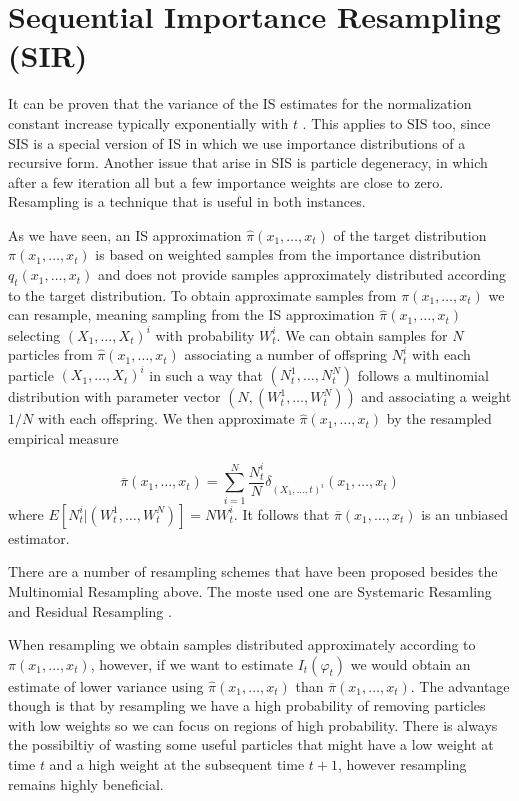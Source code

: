 \documentclass[11pt,a4paper]{article}
\begin{document}
\section{Sequential Importance Resampling (SIR)} \label{sec{SIR}}

It can be proven that the variance of the IS estimates for the normalization constant increase typically exponentially with $t$ \cite{Kong}. This applies to SIS too, since SIS is a special version of IS in which we use importance distributions of a recursive form.
Another issue that arise in SIS is particle degeneracy, in which after a few iteration all but a few importance weights are close to zero.
Resampling is a technique that is useful in both instances.

As we have seen, an IS approximation $\hat{\pi}(x_1, \dots, x_t)$ of the target distribution $\pi(x_1, \dots, x_t)$ is based on weighted samples from the importance distribution $q_t(x_1, \dots, x_t)$ and does not provide samples approximately distributed according to the target distribution. To obtain approximate samples from $\pi(x_1, \dots, x_t)$ we can resample, meaning sampling from the IS approximation $\hat{\pi}(x_1, \dots, x_t)$ selecting $(X_1, \dots, X_t)^i$ with probability $W_t^i$. We can obtain samples for $N$ particles from $\hat{\pi}(x_1, \dots, x_t)$ associating a number of offspring $N^i_t$ with each particle $(X_1, \dots, X_t)^i$ in such a way that $(N_t^1, \dots, N^N_t)$ follows a multinomial distribution with parameter vector $(N, (W_t^1, \dots, W_t^N))$ and associating a weight $1/N$ with each offspring. We then approximate $\hat{\pi}(x_1, \dots, x_t)$ by the resampled empirical measure

\begin{equation*}
    \overline{\pi}(x_1, \dots, x_t) = \sum_{i=1}^N \frac{N^i_t}{N} \delta_{(X_1, \dots, t)^i}(x_1, \dots, x_t)
\end{equation*}
where $E[N^i_t | (W_t^1, \dots, W_t^N) ] = N W^i_t$. It follows that $\overline{\pi}(x_1, \dots, x_t)$ is an unbiased estimator.

There are a number of resampling schemes that have been proposed besides the Multinomial Resampling above. The moste used one are Systemaric Resamling and Residual Resampling \cite{DoucetTutorial}.

When resampling we obtain samples distributed approximately according to $\pi(x_1, \dots, x_t)$, however, if we want to estimate $I_t(\varphi_t)$ we would obtain an estimate of lower variance using $\hat{\pi}(x_1, \dots, x_t)$ than $\overline{\pi}(x_1, \dots, x_t)$. The advantage though is that by resampling we have a high probability of removing particles with low weights so we can focus on regions of high probability. There is always the possibiltiy of wasting some useful particles that might have a low weight at time $t$ and a high weight at the subsequent time $t+1$, however resampling remains highly beneficial.
\end{document}
